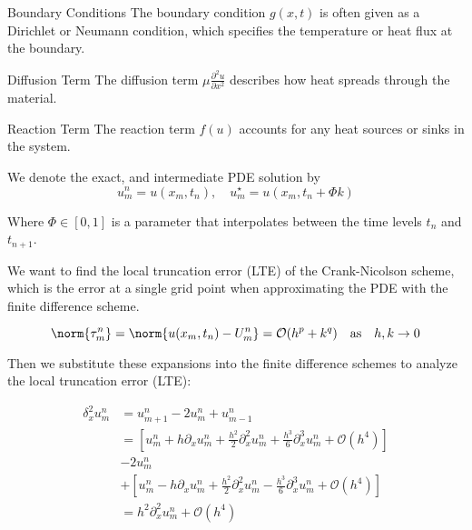 \begin{remark}{Boundary Conditions}{}
  The boundary condition $g(x, t)$ is often given as a Dirichlet or Neumann condition, which specifies the temperature or heat flux at the boundary.
\end{remark}

\begin{remark}{Diffusion Term}{}
  The diffusion term $\mu \frac{\partial^2 u}{\partial x^2}$ describes how heat spreads through the material.
\end{remark}

\begin{remark}{Reaction Term}{}
  The reaction term $f(u)$ accounts for any heat sources or sinks in the system.
\end{remark}





We denote the exact, and intermediate PDE solution by
\[
  u_m^n = u(x_m, t_n), \quad u_m^\star = u(x_m, t_n + \Phi k)
\]

Where \(\Phi \in [0, 1]\) is a parameter that interpolates between the time levels \(t_n\) and \(t_{n+1}\).

We want to find the local truncation error (LTE) of the Crank-Nicolson scheme, which is the error at a single grid point when approximating the PDE with the finite difference scheme.

\[
  \norm{\tau_m^n} = \norm{u(x_m, t_n) - U_m^n} = \mathcal{O}(h^p + k^q) \quad \text{as} \quad h, k \to 0
\]

Then we substitute these expansions into the finite difference schemes to analyze the local truncation error (LTE):

\begin{align*}
  \delta_x^2 u_m^n & = u_{m+1}^n - 2 u_m^n + u_{m-1}^n                                                                                                    \\
                   & = \left[ u_m^n + h \partial_x u_m^n + \frac{h^2}{2} \partial_x^2 u_m^n + \frac{h^3}{6} \partial_x^3 u_m^n + \mathcal{O}(h^4) \right] \\
                   & - 2 u_m^n                                                                                                                            \\
                   & + \left[ u_m^n - h \partial_x u_m^n + \frac{h^2}{2} \partial_x^2 u_m^n - \frac{h^3}{6} \partial_x^3 u_m^n + \mathcal{O}(h^4) \right] \\
                   & = h^2 \partial_x^2 u_m^n + \mathcal{O}(h^4)
\end{align*}

